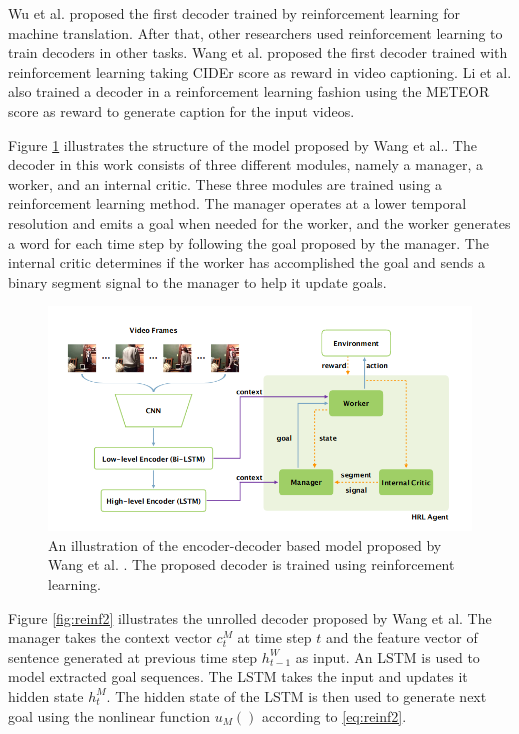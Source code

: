 \documentclass[preprint, 12pt]{elsarticle}
\begin{document}
		Wu et al. \cite{wu2016google} proposed the first decoder trained by reinforcement learning for machine translation. After that, other researchers used reinforcement learning to train decoders in other tasks. Wang et al. \cite{wang2018video} proposed the first decoder trained with reinforcement learning taking CIDEr\cite{vedantam2015cider} score as reward in video captioning. Li et al. \cite{li2018jointly} also trained a decoder in a reinforcement learning fashion using the METEOR \cite{banerjee2005meteor} score as reward to generate caption for the input videos. 
		
		Figure \ref{fig:reinf1} illustrates the structure of the model proposed by Wang et al.\cite{wang2018video}. The decoder in this work consists of three different modules, namely a manager, a worker, and an internal critic. These three modules are trained using a reinforcement learning method. The manager operates at a lower temporal resolution and emits a goal when needed for the worker, and the worker generates a word for each time step by following the goal proposed by the manager. The internal critic determines if the worker has accomplished the goal and sends a binary segment signal to the manager to help it update goals. 
		
		\begin{figure}[h]
			\centering
			\includegraphics[scale=0.5]{Imgs/reinf1.png}
			\caption{An illustration of the encoder-decoder based model proposed by Wang et al. \cite{wang2018video}. The proposed decoder is trained using reinforcement learning.}
			\label{fig:reinf1}
		\end{figure}
	
		Figure \ref{fig:reinf2} illustrates the unrolled decoder proposed by Wang et al. The manager takes the context vector $c_t^M$ at time step $t$ and the feature vector of sentence generated at previous time step $h_{t-1}^W$ as input. An LSTM is used to model extracted goal sequences. The LSTM takes the input and updates it hidden state $h_t^M$. The hidden state of the LSTM is then used to generate next goal using the nonlinear function $u_M()$ according to \eqref{eq:reinf2}.
		
\end{document}
